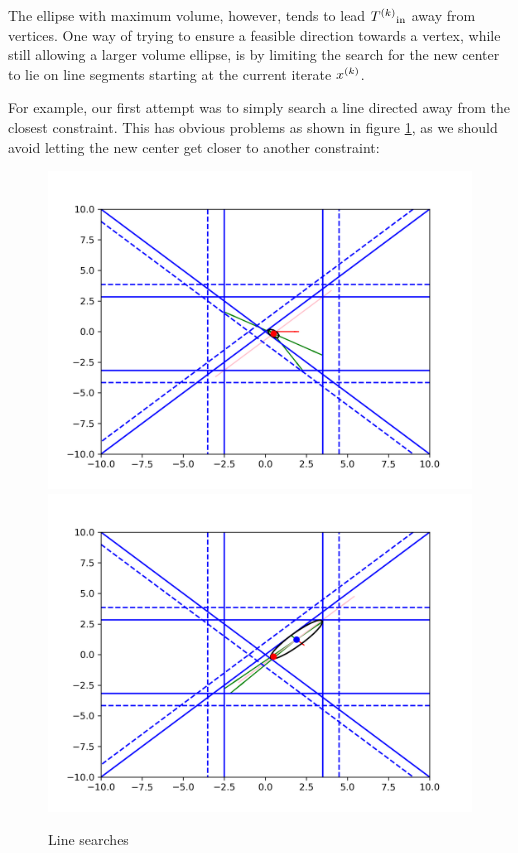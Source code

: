 The ellipse with maximum volume, however, tends to lead ${T^{(k)}}_{\text{in}}$ away from vertices.
One way of trying to ensure a feasible direction towards a vertex, while still allowing a larger volume ellipse, is by limiting the search for the new center to lie on line segments starting at the current iterate ${x}^{(k)}$.

For example, our first attempt was to simply search a line directed away from the closest constraint.
This has obvious problems as shown in figure \cref{first_line_search}, as we should avoid letting the new center get closer to another constraint:

\begin{figure}[h]
    \centering
    \includegraphics[scale=0.4]{images/line_1.png}
    \includegraphics[scale=0.4]{images/line_2.png}
    \caption{Line searches}
    \label{first_line_search}
\end{figure}


